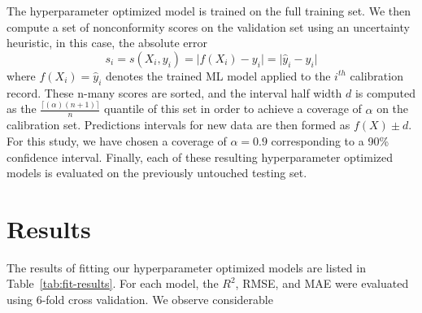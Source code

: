 \documentclass[journal,article,submit,pdftex,moreauthors]{Definitions/mdpi}
\begin{document}
The hyperparameter optimized model is trained on the full training set. We then compute a set of nonconformity scores on the validation set using an uncertainty heuristic, in this case, the absolute error
\begin{equation}
    s_i = s(X_i, y_i) = \lvert f(X_i) - y_i \rvert = \lvert \hat{y}_i - y_i \rvert
\end{equation}
where $f(X_i)=\hat{y}_i$ denotes the trained ML model applied to the $i^{th}$ calibration record. These n-many scores are sorted, and the interval half width $d$ is computed as the $\frac{\lceil(\alpha)(n+1) \rceil}{n}$ quantile of this set in order to achieve a coverage of $\alpha$ on the calibration set. Predictions intervals for new data are then formed as $f(X)\pm d$. For this study, we have chosen a coverage of $\alpha=0.9$ corresponding to a 90\% confidence interval. Finally, each of these resulting hyperparameter optimized models is evaluated on the previously untouched testing set.


\section{Results}

The results of fitting our hyperparameter optimized models are listed in Table~\ref{tab:fit-results}. For each model, the $R^2$, RMSE, and MAE were evaluated using 6-fold cross validation. We observe considerable 
\end{document}
